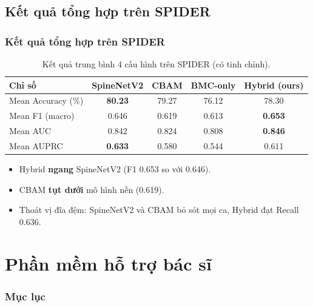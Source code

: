 \documentclass{beamer}
\numberwithin{figure}{section}
\numberwithin{table}{section}
\begin{document}
\subsection{Kết quả tổng hợp trên SPIDER}
\begin{frame}
\frametitle{Kết quả tổng hợp trên SPIDER}
\begin{table}
\centering
\small
\begin{tabular}{lcccc}
\toprule
\textbf{Chỉ số} & \textbf{SpineNetV2} & \textbf{CBAM} & \textbf{BMC-only} & \textbf{Hybrid (ours)} \\
\midrule
Mean Accuracy (\%) & \textbf{80.23} & 79.27 & 76.12 & 78.30 \\
Mean F1 (macro)    & 0.646 & 0.619 & 0.613 & \textbf{0.653} \\
Mean AUC           & 0.842 & 0.824 & 0.808 & \textbf{0.846} \\
Mean AUPRC         & \textbf{0.633} & 0.580 & 0.544 & 0.611 \\
\bottomrule
\end{tabular}
\caption{Kết quả trung bình 4 cấu hình trên SPIDER (có tinh chỉnh).}
\end{table}
\begin{itemize}
    \item[--] Hybrid \textbf{ngang} SpineNetV2 (F1 0.653 so với 0.646).
    \item[--] CBAM \textbf{tụt dưới} mô hình nền (0.619).
    \item[--] Thoát vị đĩa đệm: SpineNetV2 và CBAM bỏ sót mọi ca, Hybrid đạt Recall 0.636.
\end{itemize}
\end{frame}



\section{Phần mềm hỗ trợ bác sĩ}
{
    \begin{frame}[t]
        \frametitle{Mục lục}
    \end{frame}
}
\end{document}
